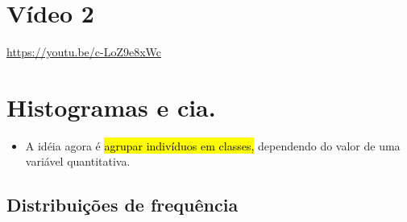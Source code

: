 \documentclass[
  11pt]{report}
\providecommand{\tightlist}{%
  \setlength{\itemsep}{0pt}\setlength{\parskip}{0pt}}
\begin{document}
\hypertarget{vuxeddeo-2-2}{%
\section{Vídeo 2}\label{vuxeddeo-2-2}}

\begin{center} \url{https://youtu.be/c-LoZ9e8xWc} \end{center}

\hypertarget{histogramas-e-cia.}{%
\section{Histogramas e cia.}\label{histogramas-e-cia.}}

\begin{itemize}
\tightlist
\item
  A idéia agora é {\hl{agrupar indivíduos em classes,}} dependendo do valor de uma variável quantitativa.
\end{itemize}

\hypertarget{distribuiuxe7uxf5es-de-frequuxeancia}{%
\subsection{Distribuições de frequência}\label{distribuiuxe7uxf5es-de-frequuxeancia}}
\end{document}
